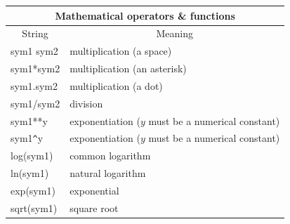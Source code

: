 \documentclass[twoside,11pt]{article}
\renewcommand{\_}{\texttt{\symbol{95}}}
\begin{document}
\begin{center}
\begin{tabular}{|l|l|}
\hline
\multicolumn{2}{|c|}{{\large Mathematical operators \& functions}} \\
\hline
\multicolumn{1}{|c|}{String} & \multicolumn{1}{|c|}{Meaning} \\ \hline
sym1 sym2           & multiplication (a space) \\
sym1*sym2           & multiplication (an asterisk) \\
sym1.sym2           & multiplication (a dot) \\
sym1/sym2           & division \\
sym1**y             & exponentiation ($y$ must be a numerical constant)\\
sym1\verb+^+y       & exponentiation ($y$ must be a numerical constant)\\
log(sym1)           & common logarithm \\
ln(sym1)            & natural logarithm \\
exp(sym1)           & exponential \\
sqrt(sym1)          & square root \\
\hline
\end{tabular}
\end{center}
\end{document}
